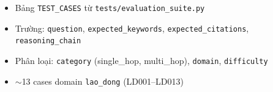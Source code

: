 \documentclass[../DoAn.tex]{subfiles}
\begin{document}
\begin{itemize}[nosep, leftmargin=*]
    \item Bảng \texttt{TEST\_CASES} từ \texttt{tests/evaluation\_suite.py}
    \item Trường: \texttt{question}, \texttt{expected\_keywords}, \texttt{expected\_citations}, \texttt{reasoning\_chain}
    \item Phân loại: \texttt{category} (single\_hop, multi\_hop), \texttt{domain}, \texttt{difficulty}
    \item $\sim$13 cases domain \texttt{lao\_dong} (LD001--LD013)
\end{itemize}
\end{document}
